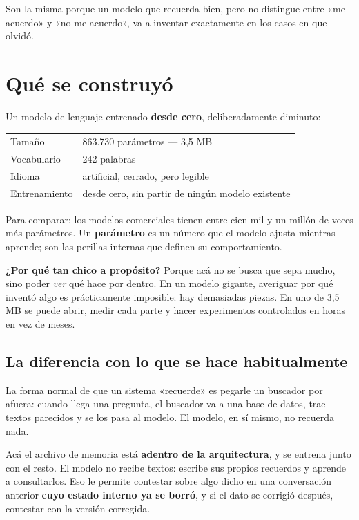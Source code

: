 \documentclass[11pt,a4paper]{article}
\begin{document}
Son la misma porque un modelo que recuerda bien, pero no distingue entre «me acuerdo» y «no me
acuerdo», va a inventar exactamente en los casos en que olvidó.

\section{Qué se construyó}

Un modelo de lenguaje entrenado \textbf{desde cero}, deliberadamente diminuto:

\begin{center}
\begin{tabular}{ll}
\toprule
Tamaño & 863.730 parámetros --- 3,5 MB \\
Vocabulario & 242 palabras \\
Idioma & artificial, cerrado, pero legible \\
Entrenamiento & desde cero, sin partir de ningún modelo existente \\
\bottomrule
\end{tabular}
\end{center}

Para comparar: los modelos comerciales tienen entre cien mil y un millón de veces más
parámetros. Un \textbf{parámetro} es un número que el modelo ajusta mientras aprende; son las
perillas internas que definen su comportamiento.

\textbf{¿Por qué tan chico a propósito?} Porque acá no se busca que sepa mucho, sino poder
\emph{ver} qué hace por dentro. En un modelo gigante, averiguar por qué inventó algo es
prácticamente imposible: hay demasiadas piezas. En uno de 3,5 MB se puede abrir, medir cada
parte y hacer experimentos controlados en horas en vez de meses.

\subsection{La diferencia con lo que se hace habitualmente}

La forma normal de que un sistema «recuerde» es pegarle un buscador por afuera: cuando llega una
pregunta, el buscador va a una base de datos, trae textos parecidos y se los pasa al modelo. El
modelo, en sí mismo, no recuerda nada.

Acá el archivo de memoria está \textbf{adentro de la arquitectura}, y se entrena junto con el
resto. El modelo no recibe textos: escribe sus propios recuerdos y aprende a consultarlos. Eso
le permite contestar sobre algo dicho en una conversación anterior \textbf{cuyo estado interno ya
se borró}, y si el dato se corrigió después, contestar con la versión corregida.
\end{document}
